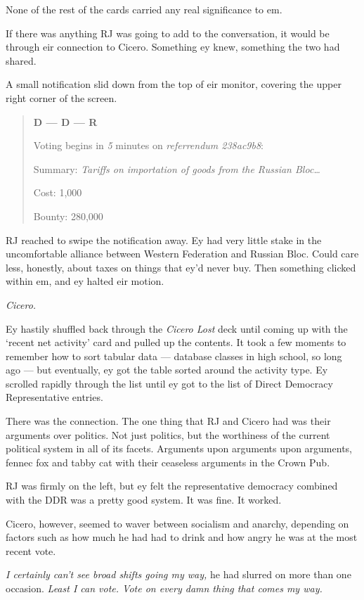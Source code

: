 None of the rest of the cards carried any real significance to em.

If there was anything RJ was going to add to the conversation, it would be through eir connection to Cicero. Something ey knew, something the two had shared.

A small notification slid down from the top of eir monitor, covering the upper right corner of the screen.

\begin{quote}
\textbf{D --- D --- R}

Voting begins in \emph{5} minutes on \emph{referrendum 238ac9b8}:

Summary: \emph{Tariffs on importation of goods from the Russian Bloc\ldots{}}

Cost: 1,000

Bounty: 280,000
\end{quote}

RJ reached to swipe the notification away. Ey had very little stake in the uncomfortable alliance between Western Federation and Russian Bloc. Could care less, honestly, about taxes on things that ey'd never buy. Then something clicked within em, and ey halted eir motion.

\emph{Cicero.}

Ey hastily shuffled back through the \emph{Cicero Lost} deck until coming up with the `recent net activity' card and pulled up the contents. It took a few moments to remember how to sort tabular data --- database classes in high school, so long ago --- but eventually, ey got the table sorted around the activity type. Ey scrolled rapidly through the list until ey got to the list of Direct Democracy Representative entries.

There was the connection. The one thing that RJ and Cicero had was their arguments over politics. Not just politics, but the worthiness of the current political system in all of its facets. Arguments upon arguments upon arguments, fennec fox and tabby cat with their ceaseless arguments in the Crown Pub.

RJ was firmly on the left, but ey felt the representative democracy combined with the DDR was a pretty good system. It was fine. It worked.

Cicero, however, seemed to waver between socialism and anarchy, depending on factors such as how much he had had to drink and how angry he was at the most recent vote.

\emph{I certainly can't see broad shifts going my way,} he had slurred on more than one occasion. \emph{Least I can vote. Vote on every damn thing that comes my way.}

